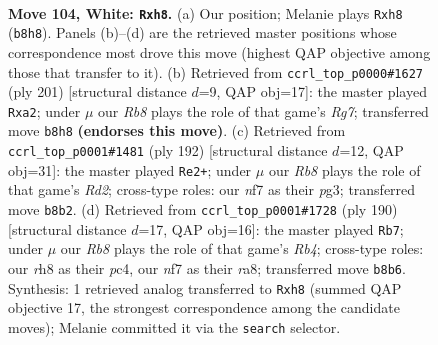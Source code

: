\documentclass[11pt]{article}
\begin{document}
\clearpage

\begin{figure}[p]\centering
\begin{subfigure}{0.46\textwidth}\centering
\resizebox{\linewidth}{!}{%
\newchessgame
\chessboard[
  setfen={1R5r/P2k1n2/8/8/8/4K3/8/8 w - - 7 104},
  showmover=false,
  pgfstyle=straightmove, color=movearrow, markmove={b8-h8}
]}
\caption{}
\end{subfigure}\hfill
\begin{subfigure}{0.46\textwidth}\centering
\resizebox{\linewidth}{!}{%
\newchessgame
\chessboard[
  setfen={8/8/5K2/8/1k6/2N5/R5r1/8 b - - 6 101},
  showmover=false,
  pgfstyle=straightmove, color=movearrow, markmove={g2-a2}
]}
\caption{}
\end{subfigure}
\\[4pt]
\begin{subfigure}{0.46\textwidth}\centering
\resizebox{\linewidth}{!}{%
\newchessgame
\chessboard[
  setfen={8/3r4/4k1K1/8/7P/6p1/3R4/8 w - - 0 97},
  showmover=false,
  pgfstyle=straightmove, color=movearrow, markmove={d2-e2}
]}
\caption{}
\end{subfigure}\hfill
\begin{subfigure}{0.46\textwidth}\centering
\resizebox{\linewidth}{!}{%
\newchessgame
\chessboard[
  setfen={r7/2K1k3/8/8/1Rp3P1/8/8/8 w - - 15 96},
  showmover=false,
  pgfstyle=straightmove, color=movearrow, markmove={b4-b7}
]}
\caption{}
\end{subfigure}
\caption{\textbf{Move 104, White: \texttt{Rxh8}.} (a) Our position; Melanie plays \texttt{Rxh8} (\texttt{b8h8}). Panels (b)--(d) are the retrieved master positions whose correspondence most drove this move (highest QAP objective among those that transfer to it). (b) Retrieved from \texttt{ccrl\_top\_p0000\#1627} (ply 201) [structural distance $d$=9, QAP obj=17]: the master played \texttt{Rxa2}; under $\mu$ our \emph{Rb8} plays the role of that game's \emph{Rg7}; transferred move \texttt{b8h8} \textbf{(endorses this move)}. (c) Retrieved from \texttt{ccrl\_top\_p0001\#1481} (ply 192) [structural distance $d$=12, QAP obj=31]: the master played \texttt{Re2+}; under $\mu$ our \emph{Rb8} plays the role of that game's \emph{Rd2}; cross-type roles: our \emph{n}f7 as their \emph{p}g3; transferred move \texttt{b8b2}. (d) Retrieved from \texttt{ccrl\_top\_p0001\#1728} (ply 190) [structural distance $d$=17, QAP obj=16]: the master played \texttt{Rb7}; under $\mu$ our \emph{Rb8} plays the role of that game's \emph{Rb4}; cross-type roles: our \emph{r}h8 as their \emph{p}c4, our \emph{n}f7 as their \emph{r}a8; transferred move \texttt{b8b6}. Synthesis: 1 retrieved analog transferred to \texttt{Rxh8} (summed QAP objective 17, the strongest correspondence among the candidate moves); Melanie committed it via the \texttt{search} selector.}
\label{fig:thought-m206}
\end{figure}
\end{document}
